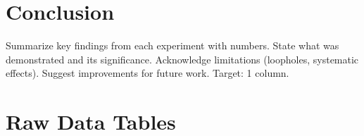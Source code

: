 \documentclass[aps,prl,twocolumn,10pt,superscriptaddress]{revtex4-2}
\begin{document}

\section{Conclusion}

\begin{guidance}
Summarize key findings from each experiment with numbers.
State what was demonstrated and its significance.
Acknowledge limitations (loopholes, systematic effects).
Suggest improvements for future work.
Target: 1 column.
\end{guidance}

\appendix
\onecolumngrid
\section{Raw Data Tables}
\label{app:raw-data}




\end{document}
